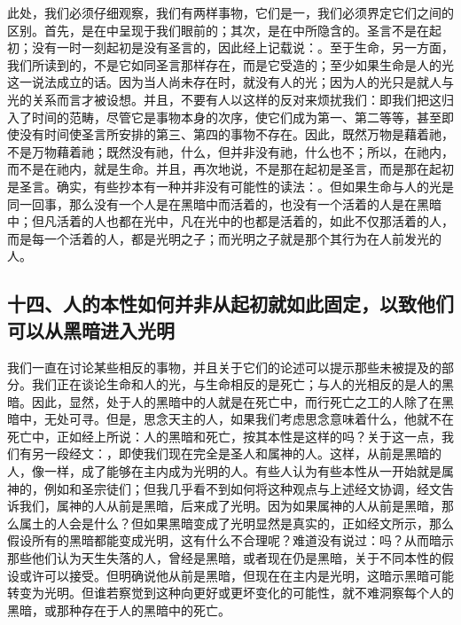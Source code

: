 此处，我们必须仔细观察，我们有两样事物，它们是一，我们必须界定它们之间的区别。首先，是在中呈现于我们眼前的；其次，是在中所隐含的。圣言不是在起初；没有一时一刻起初是没有圣言的，因此经上记载说：。至于生命，另一方面，我们所读到的，不是它如同圣言那样存在，而是它受造的；至少如果生命是人的光这一说法成立的话。因为当人尚未存在时，就没有人的光；因为人的光只是就人与光的关系而言才被设想。并且，不要有人以这样的反对来烦扰我们：即我们把这归入了时间的范畴，尽管它是事物本身的次序，使它们成为第一、第二等等，甚至即使没有时间使圣言所安排的第三、第四的事物不存在。因此，既然万物是藉着祂，不是万物藉着祂；既然没有祂，什么，但并非没有祂，什么也不；所以，在祂内，而不是在祂内，就是生命。并且，再次地说，不是那在起初是圣言，而是那在起初是圣言。确实，有些抄本有一种并非没有可能性的读法：。但如果生命与人的光是同一回事，那么没有一个人是在黑暗中而活着的，也没有一个活着的人是在黑暗中；但凡活着的人也都在光中，凡在光中的也都是活着的，如此不仅那活着的人，而是每一个活着的人，都是光明之子；而光明之子就是那个其行为在人前发光的人。\par


\subsection{十四、人的本性如何并非从起初就如此固定，以致他们可以从黑暗进入光明}

我们一直在讨论某些相反的事物，并且关于它们的论述可以提示那些未被提及的部分。我们正在谈论生命和人的光，与生命相反的是死亡；与人的光相反的是人的黑暗。因此，显然，处于人的黑暗中的人就是在死亡中，而行死亡之工的人除了在黑暗中，无处可寻。但是，思念天主的人，如果我们考虑思念意味着什么，他就不在死亡中，正如经上所说：人的黑暗和死亡，按其本性是这样的吗？关于这一点，我们有另一段经文：，即使我们现在完全是圣人和属神的人。这样，从前是黑暗的人，像一样，成了能够在主内成为光明的人。有些人认为有些本性从一开始就是属神的，例如和圣宗徒们；但我几乎看不到如何将这种观点与上述经文协调，经文告诉我们，属神的人从前是黑暗，后来成了光明。因为如果属神的人从前是黑暗，那么属土的人会是什么？但如果黑暗变成了光明显然是真实的，正如经文所示，那么假设所有的黑暗都能变成光明，这有什么不合理呢？难道没有说过：吗？从而暗示那些他们认为天生失落的人，曾经是黑暗，或者现在仍是黑暗，关于不同本性的假设或许可以接受。但明确说他从前是黑暗，但现在在主内是光明，这暗示黑暗可能转变为光明。但谁若察觉到这种向更好或更坏变化的可能性，就不难洞察每个人的黑暗，或那种存在于人的黑暗中的死亡。\par

